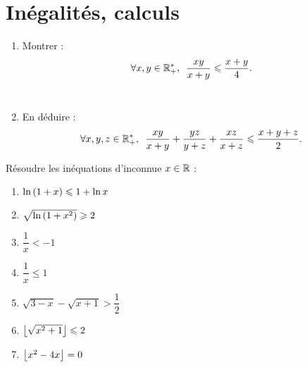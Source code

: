 \chapter{Inégalités, calculs}

\minitoc

\begin{exo}[Exercice 1]
\begin{enumerate}
\item Montrer : \[\quantifs{\forall x,y\in\Rps}\dfrac{xy}{x+y}\leq\dfrac{x+y}{4}.\] \\

\item En déduire : \[\quantifs{\forall x,y,z\in\Rps}\dfrac{xy}{x+y}+\dfrac{yz}{y+z}+\dfrac{xz}{x+z}\leq\dfrac{x+y+z}{2}.\]
\end{enumerate}
\end{exo}

\begin{corr}
\end{corr}

\begin{exo}[Exercice 2]
Résoudre les inéquations d'inconnue \(x\in\mathbb{R}\) :

\begin{enumerate}
\item \(\ln\left(1+x\right)\leqslant1+\ln x\) \\

\item \(\sqrt{\ln\left(1+x^2\right)}\geqslant2\) \\

\item \(\dfrac{1}{x}<-1\) \\

\item \(\dfrac{1}{x}\leq1\) \\

\item \(\sqrt{3-x}-\sqrt{x+1}>\dfrac{1}{2}\) \\

\item \(\left\lfloor\sqrt{x^2+1}\right\rfloor\leqslant2\) \\

\item \(\left\lfloor x^2-4x\right\rfloor=0\)
\end{enumerate}
\end{exo}

\begin{corr}
\end{corr}

